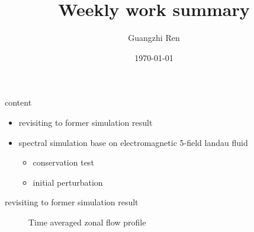 \documentclass{beamer}
\title{Weekly work summary}
\author{Guangzhi Ren}
\institute {}
\date{\today}
\begin{document}
	
\begin{frame}
	\titlepage   
\end{frame}


\begin{frame}{content}
\begin{itemize}
	\item revisiting to former simulation result
	\item spectral simulation base on electromagnetic 5-field landau fluid
		\begin{itemize}
			\item conservation test
			\item initial perturbation
		\end{itemize}
\end{itemize}
\end{frame}



\begin{frame}{revisiting to former simulation result}
	\begin{figure}[H]
		\centering
		\caption{ Time averaged zonal flow profile }
	\end{figure}
	
\end{frame}
\end{document}

